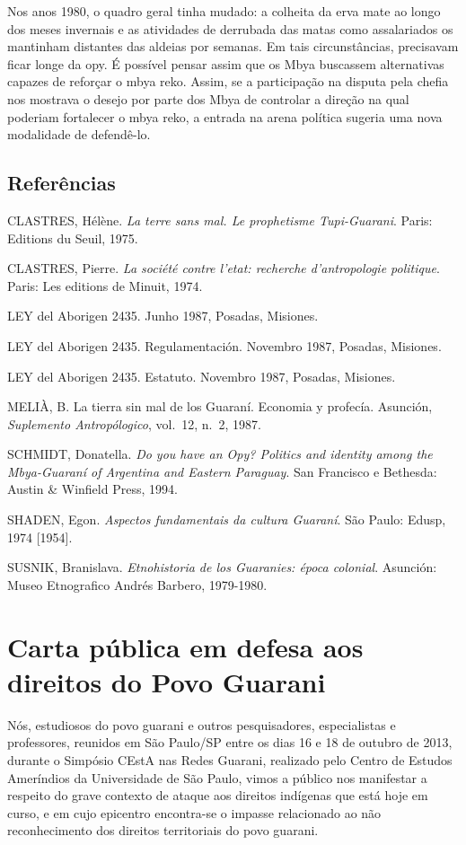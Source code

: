 Nos anos 1980, o quadro geral tinha mudado: a colheita da erva mate ao
longo dos meses invernais e as atividades de derrubada das matas como
assalariados os mantinham distantes das aldeias por semanas. Em tais
circunstâncias, precisavam ficar longe da opy. É possível pensar assim
que os Mbya buscassem alternativas capazes de reforçar o mbya reko.
Assim, se a participação na disputa pela chefia nos mostrava o desejo
por parte dos Mbya de controlar a direção na qual poderiam fortalecer o
mbya reko, a entrada na arena política sugeria uma nova modalidade de
defendê-lo. 

\section{Referências}

CLASTRES, Hélène. \emph{La terre sans mal. Le prophetisme Tupi-Guarani}. Paris:
Editions du Seuil, 1975.

CLASTRES, Pierre. \emph{La société contre l’etat: recherche d’antropologie
politique}. Paris: Les editions de Minuit, 1974.

LEY del Aborigen 2435. Junho 1987, Posadas, Misiones.

LEY del Aborigen 2435. Regulamentación. Novembro 1987, Posadas,
Misiones.

LEY del Aborigen 2435. Estatuto. Novembro 1987, Posadas, Misiones.

MELIÀ, B. La tierra sin mal de los Guaraní. Economia y profecía.
Asunción, \emph{Suplemento Antropólogico}, vol.~12, n.~2, 1987.

SCHMIDT, Donatella. \emph{Do you have an Opy? Politics and identity among the
Mbya-Guaraní of Argentina and Eastern Paraguay}. San Francisco e
Bethesda: Austin \& Winfield Press, 1994.

SHADEN, Egon. \emph{Aspectos fundamentais da cultura Guaraní}. São Paulo:
Edusp, 1974 [1954].

SUSNIK, Branislava. \emph{Etnohistoria de los Guaranies: época colonial}.
Asunción: Museo Etnografico Andrés Barbero, 1979-1980.

\chapter{Carta pública em defesa aos direitos do Povo Guarani}

Nós, estudiosos do povo guarani e outros pesquisadores, especialistas e
professores, reunidos em São Paulo/SP entre os dias 16 e 18 de outubro
de 2013, durante o Simpósio CEstA nas Redes Guarani, realizado pelo
Centro de Estudos Ameríndios da Universidade de São Paulo, vimos a
público nos manifestar a respeito do grave contexto de ataque aos
direitos indígenas que está hoje em curso, e em cujo epicentro
encontra-se o impasse relacionado ao não reconhecimento dos direitos
territoriais do povo guarani.

